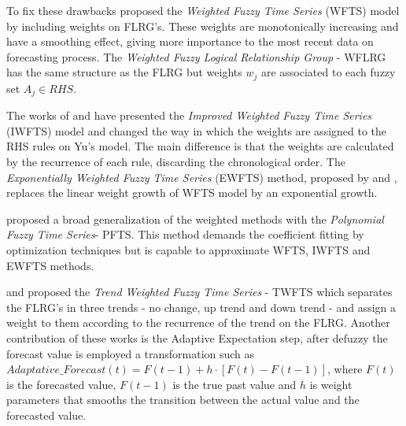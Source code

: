 
To fix these drawbacks \cite{yu2005weighted} proposed the \textit{Weighted Fuzzy Time Series} (WFTS) model by including weights on FLRG's. These weights are monotonically increasing and have a smoothing effect, giving more importance to the most recent data on forecasting process. The \textit{Weighted Fuzzy Logical Relationship Group} - WFLRG has the same structure as the FLRG but weights $w_j$ are associated to each fuzzy set $A_j \in RHS$. 


The works of \cite{ismail2011enrollment} and \cite{efendi2013improved} have presented the \textit{Improved Weighted Fuzzy Time Series} (IWFTS) model and changed the way in which the weights are assigned to the RHS rules on Yu's model. The main difference is that the weights are calculated by the recurrence of each rule, discarding the chronological order. The \textit{Exponentially Weighted Fuzzy Time Series} (EWFTS) method, proposed by \cite{sadaei2014short} and \cite{Talarposhti2016a}, replaces the linear weight growth of WFTS model by an exponential growth. 


\cite{lee2013introducing} proposed a broad generalization of the weighted methods with the \textit{Polynomial Fuzzy Time Series}- PFTS. This method demands the coefficient fitting by optimization techniques but is capable to approximate WFTS, IWFTS and EWFTS methods.


\cite{Cheng2008} and \cite{cheng2009forecasting} proposed the \textit{Trend Weighted Fuzzy Time Series} - TWFTS which separates the FLRG's in three trends - no change, up trend and down trend - and assign a weight to them according to the recurrence of the trend on the FLRG. Another contribution of these works is the Adaptive Expectation step, after defuzzy the forecast value is employed a transformation such as $Adaptative\_Forecast(t) = F(t-1) + h\cdot[F(t) - F(t-1)]$, where $F(t)$ is the forecasted value, $F(t-1)$ is the true past value and $h$ is weight parameters that smooths the transition between the actual value and the forecasted value.

